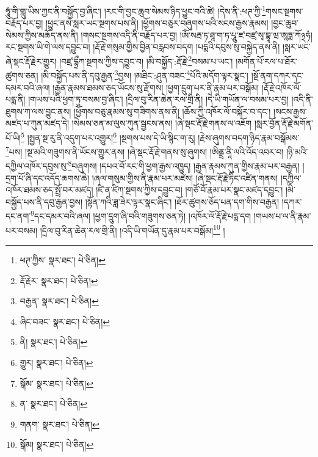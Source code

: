 ཧཱུཾ་གི་གླུ་ཡིས་ཀྱང་ནི་བསྐྱོད་བྱ་ཞིང་། །རང་གི་བྱང་ཆུབ་སེམས་ཉིད་ཕྱུང་བའི་ཚེ། །དེས་ནི་:ཕཊ་ཀྱི་\footnote{ཕཊ་ཀྱིས་  སྣར་ཐང་།  པེ་ཅིན། }གསང་སྔགས་བརྗོད་པར་བྱ། །ཕྱུང་ནས་སླར་ཡང་སྔགས་པས་ནི། །ཕྱོགས་བཅུར་བཞུགས་པའི་སངས་རྒྱས་རྣམས། །བྱང་ཆུབ་སེམས་ཀྱིས་མཆོད་ནས་ནི། །གསང་སྔགས་འདི་ནི་བརྗོད་པར་བྱ། །ཨོཾ་སརྦ་ཏ་ཐཱ་ག་ཏ་པཱུ་ཛ་བཛྲ་སྭ་བྷཱ་ཝ་ཨཱཏྨ་ཀོ྅ཧཾ། རང་སྔགས་ཡི་གེ་ལས་དབྱུང་བ། །རྡོ་རྗེ་གསུམ་གྱིས་བྱིན་བརླབས་བདག །པདྨའི་དབུས་སུ་བསྐྱེད་ནས་ནི། །སླར་ཡང་ཞེ་སྡང་རྡོ་རྗེར་གྱུར། །བཛྲ་དྷྲྀཀ་སྔགས་ཀྱིས་དབྱུང་བ། །མི་བསྐྱོད་:རྡོ་རྗེ་\footnote{རྡོ་རྗེར་  སྣར་ཐང་།  པེ་ཅིན། }བསམ་པ་ཡང་། །མགོན་པོ་རལ་པ་ཐོར་ཚུགས་ཅན། །མི་བསྐྱོད་པས་ནི་དབུ་རྒྱན་\footnote{བརྒྱན་  སྣར་ཐང་།  པེ་ཅིན། }བྱས། །མཐིང་:ཤུན་བཟང་\footnote{ཞིང་བཟང་  སྣར་ཐང་།  པེ་ཅིན། }པོའི་མདོག་ལྟར་སྣང་། །སྔོ་ནག་དཀར་དང་དམར་བའི་ཞལ། །རྒྱན་རྣམས་ཐམས་ཅད་ཡོངས་སུ་རྫོགས། །ཕྱག་དྲུག་པར་ནི་རྣམ་པར་བསྒོམ། །རྡོ་རྗེ་འཁོར་ལོ་པདྨ་ནི། །གཡས་པའི་ཕྱག་ཏུ་བསམ་བྱ་ཞིང་། །དྲིལ་བུ་རིན་ཆེན་རལ་གྲི་ནི། །དེ་ཡི་གཡོན་ལ་བསམ་པར་བྱ། །འདི་ནི་ཐུགས་ཀ་ལས་བྱུང་ནས། །ཕྱོགས་བཅུ་རྣམས་སུ་གཟིགས་ནས་ནི། །ཆོས་ཀྱི་འཁོར་ལོ་བསྐོར་བ་དང་། །སངས་རྒྱས་མཛད་པ་ཀུན་མཛད་དེ། །སེམས་ཅན་མ་ལུས་ཀུན་སྦྱངས་ནས། །ཞེ་སྡང་རྡོ་རྗེ་གནས་ལ་འཇོག །སླར་བྱོན་རྡོ་རྗེ་མགོན་པོ་ཡི།\footnote{ནི།  སྣར་ཐང་།  པེ་ཅིན། } །སྤྱན་སྔ་རུ་ནི་འདུག་པར་འགྱུར།\footnote{གྱུར།  སྣར་ཐང་།  པེ་ཅིན། } །སྔགས་པས་དེ་ཡི་སྙིང་ག་རུ། །རྗེས་ཞུགས་བདག་ཉིད་རྣམ་བསྒོམས་\footnote{སྒོམ་  སྣར་ཐང་།  པེ་ཅིན། }པས། །སྔ་མའི་གཟུགས་ནི་ཡོངས་གྱུར་ནས། །ཞེ་སྡང་རྡོ་རྗེ་གནས་སུ་ཞུགས། །ཨིནྡྲ་ནཱི་ལའི་འོད་འབར་བ། །ཉི་མའི་དཀྱིལ་འཁོར་དབུས་སུ་\footnote{ན་  སྣར་ཐང་།  པེ་ཅིན། }བཞུགས། །དཔའ་བོ་རང་གི་ཕྱག་རྒྱས་འཁྱུད། །རྒྱན་རྣམས་ཀུན་གྱིས་རྣམ་པར་བརྒྱན། །དྲག་པོ་ཞི་དང་འདོད་ཆགས་ཆེ། །ཞལ་གསུམ་གྱིས་ནི་རྣམ་པར་མཛེས། །ཞེ་སྡང་རྡོ་རྗེ་ཏིང་འཛིན་གནས། །དཀྱིལ་འཁོར་ཐམས་ཅད་སྤྲོ་བར་མཛད། །ཛི་ན་ཛིཀ་སྔགས་ཀྱིས་དབྱུང་བ། །གཙོ་བོ་རྣམ་པར་སྣང་མཛད་དབྱུང་། །མི་བསྐྱོད་པས་ནི་དབུ་རྒྱན་བྱས། །སྟོན་ཀའི་ཟླ་ཟེར་ལྟར་སྣང་ཞིང་། །ཐོར་ཚུགས་ཅོད་པན་དག་གིས་བརྒྱན། །དཀར་དང་ནག་\footnote{གནག་  སྣར་ཐང་།  པེ་ཅིན། }དང་དམར་བའི་ཞལ། །ཕྱག་དྲུག་ཞི་བའི་གཟུགས་ཅན་ཏེ། །འཁོར་ལོ་རྡོ་རྗེ་པདྨ་དག །གཡས་པ་ལ་ནི་རྣམ་པར་བསམ། །དྲིལ་བུ་རིན་ཆེན་རལ་གྲི་ནི། །འདི་ཡི་གཡོན་དུ་རྣམ་པར་བསྒོམ།\footnote{སྒོམ།  སྣར་ཐང་།  པེ་ཅིན། } །
